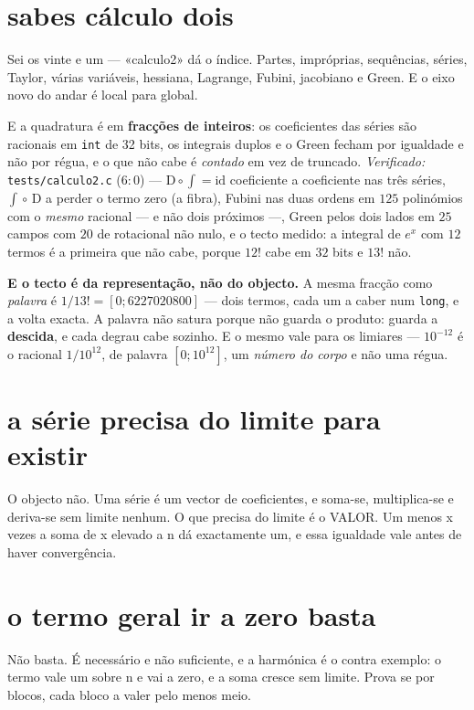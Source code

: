 \documentclass[11pt,a4paper]{article}
\newcommand{\code}[1]{\texttt{\small #1}}
\begin{document}
\section{sabes cálculo dois}
Sei os vinte e um — «calculo2» dá o índice. Partes, impróprias, sequências, séries,
Taylor, várias variáveis, hessiana, Lagrange, Fubini, jacobiano e Green. E o eixo novo
do andar é local para global.

E a quadratura é em \textbf{fracções de inteiros}: os coeficientes das séries são
racionais em \code{int} de 32 bits, os integrais duplos e o Green fecham por igualdade e
não por régua, e o que não cabe é \emph{contado} em vez de truncado. \emph{Verificado:}
\code{tests/calculo2.c} ($6{:}0$) --- $\mathrm{D}\!\circ\!\int = \mathrm{id}$ coeficiente a
coeficiente nas três séries, $\int\!\circ\,\mathrm{D}$ a perder o termo zero (a fibra), Fubini
nas duas ordens em $125$ polinómios com o \emph{mesmo} racional --- e não dois próximos ---,
Green pelos dois lados em $25$ campos com $20$ de rotacional não nulo, e o tecto medido: a
integral de $e^x$ com $12$ termos é a primeira que não cabe, porque $12!$ cabe em $32$ bits
e $13!$ não.

\textbf{E o tecto é da representação, não do objecto.} A mesma fracção como \emph{palavra}
é $1/13! = [0;6227020800]$ --- dois termos, cada um a caber num \code{long}, e a volta
exacta. A palavra não satura porque não guarda o produto: guarda a \textbf{descida}, e cada
degrau cabe sozinho. E o mesmo vale para os limiares --- $10^{-12}$ é o racional $1/10^{12}$,
de palavra $[0;10^{12}]$, um \emph{número do corpo} e não uma régua.

\section{a série precisa do limite para existir}
O objecto não. Uma série é um vector de coeficientes, e soma-se, multiplica-se e
deriva-se sem limite nenhum. O que precisa do limite é o VALOR. Um menos x vezes a soma
de x elevado a n dá exactamente um, e essa igualdade vale antes de haver convergência.

\section{o termo geral ir a zero basta}
Não basta. É necessário e não suficiente, e a harmónica é o contra exemplo: o termo vale
um sobre n e vai a zero, e a soma cresce sem limite. Prova se por blocos, cada bloco a
valer pelo menos meio.
\end{document}
